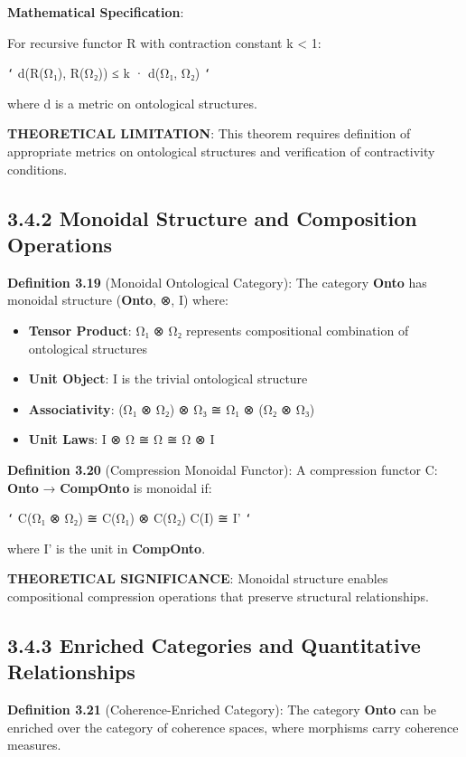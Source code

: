 \textbf{Mathematical Specification}:

For recursive functor R with contraction constant k < 1:

\texttt{`}
d(R(Ω₁), R(Ω₂)) ≤ k · d(Ω₁, Ω₂)
\texttt{`}

where d is a metric on ontological structures.

\textbf{THEORETICAL LIMITATION}: This theorem requires definition of appropriate metrics on ontological structures and verification of contractivity conditions.

\subsection{3.4.2 Monoidal Structure and Composition Operations}

\textbf{Definition 3.19} (Monoidal Ontological Category): The category \textbf{Onto} has monoidal structure (\textbf{Onto}, ⊗, I) where:

\begin{itemize}
\item \textbf{Tensor Product}: Ω₁ ⊗ Ω₂ represents compositional combination of ontological structures
\item \textbf{Unit Object}: I is the trivial ontological structure
\item \textbf{Associativity}: (Ω₁ ⊗ Ω₂) ⊗ Ω₃ ≅ Ω₁ ⊗ (Ω₂ ⊗ Ω₃)
\item \textbf{Unit Laws}: I ⊗ Ω ≅ Ω ≅ Ω ⊗ I
\end{itemize}

\textbf{Definition 3.20} (Compression Monoidal Functor): A compression functor C: \textbf{Onto} → \textbf{CompOnto} is monoidal if:

\texttt{`}
C(Ω₁ ⊗ Ω₂) ≅ C(Ω₁) ⊗ C(Ω₂)
C(I) ≅ I'
\texttt{`}

where I' is the unit in \textbf{CompOnto}.

\textbf{THEORETICAL SIGNIFICANCE}: Monoidal structure enables compositional compression operations that preserve structural relationships.

\subsection{3.4.3 Enriched Categories and Quantitative Relationships}

\textbf{Definition 3.21} (Coherence-Enriched Category): The category \textbf{Onto} can be enriched over the category of coherence spaces, where morphisms carry coherence measures.


